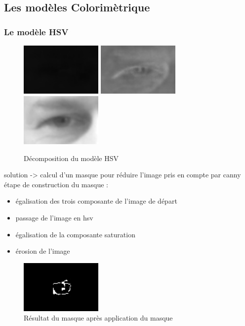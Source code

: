 \subsection{Les modèles Colorimètrique}
\subsubsection{Le modèle HSV}


\begin{figure}[H]
 \center
 \includegraphics[width=4cm]{image/hue.png}
 \includegraphics[width=4cm]{image/saturation.png}
 \includegraphics[width=4cm]{image/value.png}
 \caption{Décomposition du modèle HSV}
\end{figure}

solution -> calcul d'un masque pour réduire l'image pris en compte par canny
étape de construction du masque : 
\begin{itemize}
 \item égalisation des trois composante de l'image de départ
 \item passage de l'image en hsv
 \item égalisation de la composante saturation%
 \item érosion de l'image
\end{itemize}

\begin{figure}[H]
 \center
 \includegraphics[width=4cm]{image/resultatMasque.png}
 \caption{Résultat du masque après application du masque}
\end{figure}

